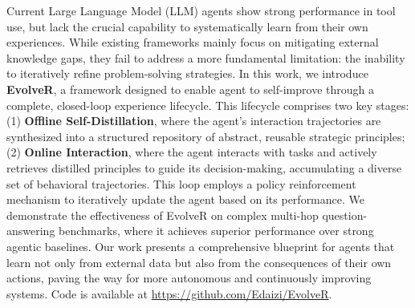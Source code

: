 Current Large Language Model (LLM) agents show strong performance in tool use, but lack the crucial capability to systematically learn from their own experiences. While existing frameworks mainly focus on mitigating external knowledge gaps, they fail to address a more fundamental limitation: the inability to iteratively refine problem-solving strategies. In this work, we introduce \textbf{EvolveR}, a framework designed to enable agent to self-improve through a complete, closed-loop experience lifecycle. This lifecycle comprises two key stages: (1) \textbf{Offline Self-Distillation}, where the agent's interaction trajectories are synthesized into a structured repository of abstract, reusable strategic principles; (2) \textbf{Online Interaction}, where the agent interacts with tasks and actively retrieves distilled principles to guide its decision-making, accumulating a diverse set of behavioral trajectories. This loop employs a policy reinforcement mechanism to iteratively update the agent based on its performance. We demonstrate the effectiveness of EvolveR on complex multi-hop question-answering benchmarks, where it achieves superior performance over strong agentic baselines. Our work presents a comprehensive blueprint for agents that learn not only from external data but also from the consequences of their own actions, paving the way for more autonomous and continuously improving systems. Code is available at \textcolor{magenta}{\url{https://github.com/Edaizi/EvolveR}}.


